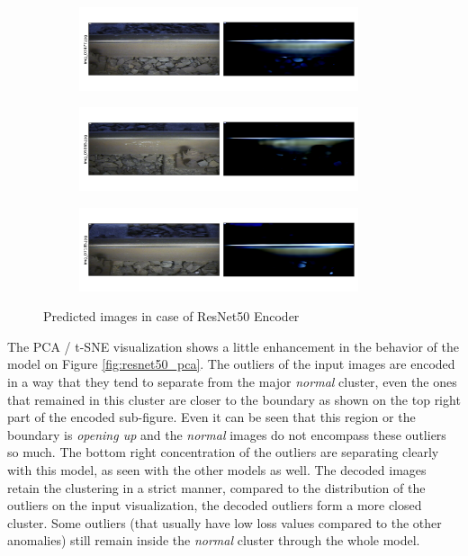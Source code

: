 \begin{figure}[H]
    \centering
    \begin{subfigure}{\textwidth}
        \centering
        \includegraphics[width=0.9\textwidth,trim={0 1cm 0 1cm},clip]{./results/resnet50_vgg19/20230514_213740_predict_0.png}
    \end{subfigure}
    \begin{subfigure}{\textwidth}
        \centering
        \includegraphics[width=0.9\textwidth,trim={0 1cm 0 1cm},clip]{./results/resnet50_vgg19/20230514_213740_predict_1.png}
    \end{subfigure}
    \begin{subfigure}{\textwidth}
        \centering
        \includegraphics[width=0.9\textwidth,trim={0 1cm 0 1cm},clip]{./results/resnet50_vgg19/20230514_213740_predict_2.png}
    \end{subfigure}
    \caption{Predicted images in case of ResNet50 Encoder}
    \label{fig:resnet50_examples}
\end{figure}

The PCA / t-SNE visualization shows a little enhancement in the behavior of the model
on Figure \ref{fig:resnet50_pca}.
The outliers of the input images are encoded in a way that they tend to separate from the
major \emph{normal} cluster, even the ones that remained in this cluster are closer to the boundary
as shown on the top right part of the encoded sub-figure.
Even it can be seen that this region or the boundary is \emph{opening up} and the \emph{normal}
images do not encompass these outliers so much.
The bottom right concentration of the outliers are separating clearly with this model,
as seen with the other models as well.
The decoded images retain the clustering in a strict manner, compared to the distribution of the
outliers on the input visualization, the decoded outliers form a more closed cluster.
Some outliers (that usually have low loss values compared to the other anomalies) still
remain inside the \emph{normal} cluster through the whole model.

